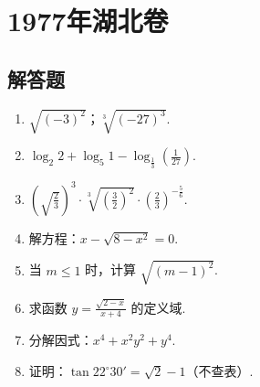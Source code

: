 \chapter{1977年湖北卷}

\section{解答题}

\begin{problem}
\begin{enumerate}
\item
\( \sqrt{\left(-3\right)^2} \)；\( \sqrt[3]{\left(-27\right)^3} \).

\item
\( \log_2 2+\log_5 1-\log_{\frac{1}{3}}\left(\frac{1}{27}\right) \).

\item
\( \left(\sqrt{\frac{2}{3}}\right)^3\cdot\sqrt[3]{\left(\frac{3}{2}\right)^2}\cdot\left(\frac{2}{3}\right)^{-\frac{5}{6}} \).

\item
解方程：\(x-\sqrt{8-x^2}=0\).

\item
当 \(m\leq 1\) 时，计算 \(\sqrt{\left(m-1\right)^2}\).

\item
求函数 \(y=\frac{\sqrt{2-x}}{x+4}\) 的定义域.

\item
分解因式：\(x^4+x^2y^2+y^4\).

\item
证明：\(\tan 22^\circ30'=\sqrt{2}-1\)（不查表）.
\end{enumerate}
\end{problem}

